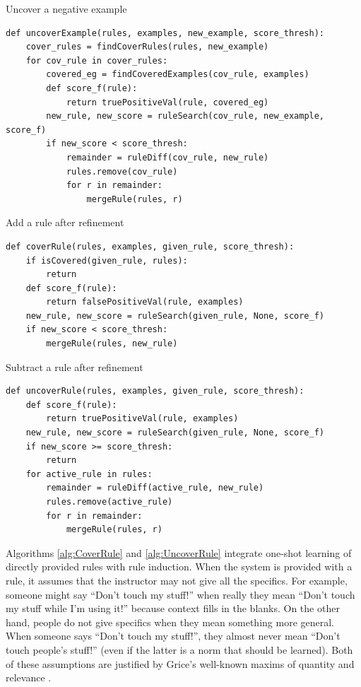 \documentclass[letterpaper]{article} %
\begin{document}
\begin{algorithm}[p]
\caption{Uncover a negative example}
\label{alg:UncoverExample}
\begin{lstlisting}
def uncoverExample(rules, examples, new_example, score_thresh):
    cover_rules = findCoverRules(rules, new_example)
    for cov_rule in cover_rules:
        covered_eg = findCoveredExamples(cov_rule, examples)
        def score_f(rule):
            return truePositiveVal(rule, covered_eg)
        new_rule, new_score = ruleSearch(cov_rule, new_example, score_f)
        if new_score < score_thresh:
            remainder = ruleDiff(cov_rule, new_rule)
            rules.remove(cov_rule)
            for r in remainder:
                mergeRule(rules, r)
\end{lstlisting}
\end{algorithm}

\begin{algorithm}[p]
\caption{Add a rule after refinement}
\label{alg:CoverRule}
\begin{lstlisting}
def coverRule(rules, examples, given_rule, score_thresh):
    if isCovered(given_rule, rules):
        return
    def score_f(rule):
        return falsePositiveVal(rule, examples)
    new_rule, new_score = ruleSearch(given_rule, None, score_f)
    if new_score < score_thresh:
        mergeRule(rules, new_rule)
\end{lstlisting}
\end{algorithm}

\begin{algorithm}[p]
\caption{Subtract a rule after refinement}
\label{alg:UncoverRule}
\begin{lstlisting}
def uncoverRule(rules, examples, given_rule, score_thresh):
    def score_f(rule):
        return truePositiveVal(rule, examples)
    new_rule, new_score = ruleSearch(given_rule, None, score_f)
    if new_score >= score_thresh:
        return
    for active_rule in rules:
        remainder = ruleDiff(active_rule, new_rule)
        rules.remove(active_rule)
        for r in remainder:
            mergeRule(rules, r)
\end{lstlisting}
\end{algorithm}

Algorithms \ref{alg:CoverRule} and \ref{alg:UncoverRule} integrate one-shot learning of directly provided rules with rule induction. When the system is provided with a rule, it assumes that the instructor may not give all the specifics. For example, someone might say ``Don't touch my stuff!'' when really they mean ``Don't touch my stuff while I'm using it!'' because context fills in the blanks. On the other hand, people do not give specifics when they mean something more general. When someone says ``Don't touch my stuff!'', they almost never mean ``Don't touch people's stuff!'' (even if the latter is a norm that should be learned). Both of these assumptions are justified by Grice's well-known maxims of quantity and relevance \cite{grice1975logic}.
\end{document}

